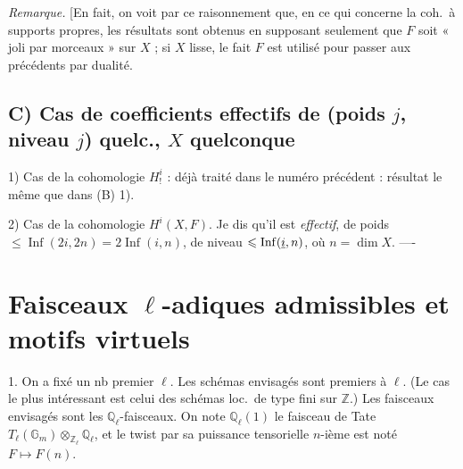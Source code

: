 \documentclass[11pt,a4paper]{article}
\begin{document}

\emph{Remarque.} [En fait, on voit par ce raisonnement que, en ce qui concerne
la coh.\ à supports propres, les résultats sont obtenus en supposant seulement
que $F$ soit « joli par morceaux » sur $X$  ; si  $X$ lisse, le fait 
$F$  est utilisé \struck{\ill{}} pour passer aux
 précédents par dualité.

\subsection{C) Cas de coefficients effectifs de (poids $j$, niveau $j$) quelc., $X$ quelconque}

1) Cas de la cohomologie $H^{i}_{!}$ : déjà traité dans le numéro
précédent : résultat le même que dans (B) 1).

2) Cas de la cohomologie $H^{i}(X, F)$. Je dis qu'il est \emph{effectif}, de
poids 
$\leqslant \operatorname{Inf}(2i, 2n) = 2 \operatorname{Inf}(i, n)$, de niveau
$\leqslant \operatorname{Inf}(\uncertain{i}, n)$, où $n = \dim X$.
 ----

\section{Faisceaux $\ell$-adiques admissibles et motifs virtuels}


1. On a fixé un nb premier $\ell$. Les schémas envisagés sont premiers à
$\ell$. (Le cas le plus intéressant est celui des schémas loc.\ de type fini
sur $\mathbb{Z}$.) Les faisceaux
envisagés sont les $\mathbb{Q}_{\ell}$-faisceaux. On note $\mathbb{Q}_{\ell}(1)$
le faisceau de Tate $T_{\ell}(\mathbb{G}_{m}) \otimes_{\mathbb{Z}_{\ell}}
\mathbb{Q}_{\ell}$, et le twist par sa puissance tensorielle $n$-ième est
noté $F \mapsto F(n)$.
\end{document}
